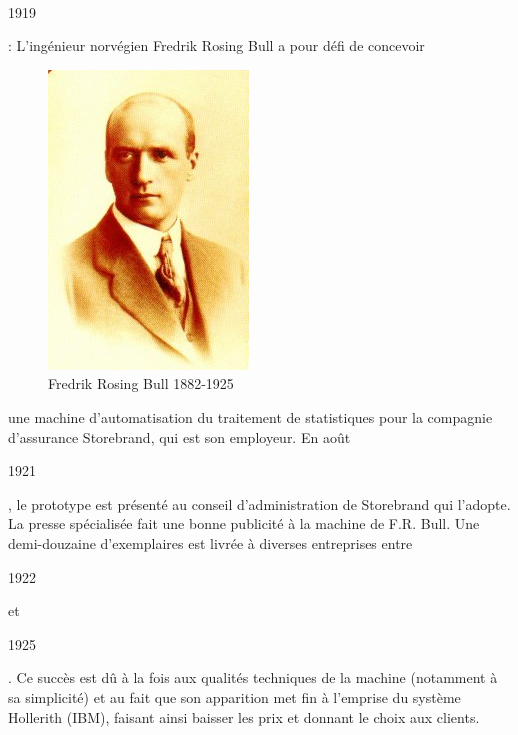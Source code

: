 \documentclass[11pt]{article}
\begin{document}
		\paragraph{}
		\begin{bf}1919\end{bf} : L’ingénieur norvégien Fredrik Rosing Bull a pour défi de concevoir 
		\begin{figure}
		\includegraphics[scale=0.75]{FredrikRosingBull.jpg}
		\caption{Fredrik Rosing Bull 1882-1925}
		\end{figure}
		une machine d’automatisation du traitement de statistiques pour la compagnie d’assurance Storebrand, qui est son employeur. 
		En août \begin{bf}1921\end{bf}, le prototype est présenté au conseil d'administration de Storebrand qui l'adopte. 
		La presse spécialisée fait une bonne publicité à la machine de F.R. Bull. Une demi-douzaine d'exemplaires est livrée à diverses entreprises 
		entre \begin{bf}1922\end{bf} et \begin{bf}1925\end{bf}. Ce succès est dû à la fois aux qualités techniques de la 
		machine (notamment à sa simplicité) et au fait que son apparition met fin à l'emprise du système Hollerith (IBM), 
		faisant ainsi baisser les prix et donnant le choix aux clients.
		\newline{}
		\newline{}
		\newline{}
		\newline{}
		\newline{}
		\newline{}
		\newline{}
		\newline{}
\end{document}
